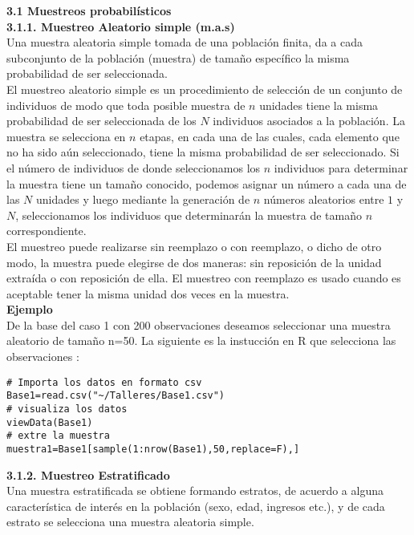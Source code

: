 \documentclass[base=hide,11pt]{elegantbook}
\begin{document}
{\textcolor{col4}{\bf \LARGE 3.1 Muestreos probabilísticos}\\

			
\textcolor{col4}{\bf \large 3.1.1. Muestreo Aleatorio simple (m.a.s) }\\
Una muestra aleatoria simple tomada de una población finita, da a cada subconjunto de la población (muestra) de tamaño específico la misma probabilidad de ser seleccionada.\\
%			
El muestreo aleatorio simple es un procedimiento de selección de un conjunto de individuos de modo que toda posible muestra de $n$ unidades tiene la misma probabilidad de ser seleccionada de los $N$ individuos asociados a la  población. La muestra se selecciona en $n$ etapas, en cada una de las cuales, cada elemento que no ha sido aún seleccionado, tiene la misma probabilidad de ser seleccionado. Si el número de individuos de donde seleccionamos los $n$ individuos para determinar la muestra tiene un tamaño conocido, podemos asignar un número a cada una de las $N$ unidades y luego mediante la generación de $n$ números aleatorios entre $1$ y $N$, seleccionamos los individuos que determinarán la  muestra de tamaño $n$ correspondiente.\\
			
El muestreo puede realizarse sin reemplazo o con reemplazo, o dicho de otro modo, la muestra puede elegirse de dos maneras: sin reposición de la unidad extraída o con reposición de ella. El muestreo con reemplazo es usado cuando es aceptable tener la misma unidad dos veces en la muestra.\\
%			
\textcolor{col3}{\bf \large Ejemplo}\\ 
De la base del caso 1 con 200 observaciones deseamos seleccionar una muestra aleatorio de tamaño n=50. La siguiente es la instucción en R que selecciona las observaciones :

\begin{verbatim}
# Importa los datos en formato csv
Base1=read.csv("~/Talleres/Base1.csv")
# visualiza los datos
viewData(Base1)
# extre la muestra
muestra1=Base1[sample(1:nrow(Base1),50,replace=F),] 
\end{verbatim}
			
\textcolor{col4}{\bf \large 3.1.2. Muestreo Estratificado}\\

Una muestra estratificada se obtiene formando estratos, de acuerdo a alguna característica de interés en la población (sexo, edad, ingresos etc.), y de cada estrato se selecciona una muestra aleatoria simple.\\
			
}
\end{document}
